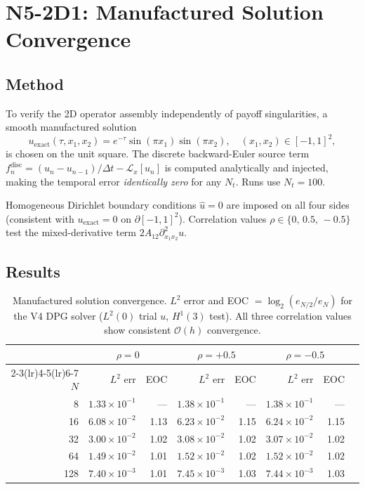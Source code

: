 \documentclass[11pt,a4paper]{article}
\begin{document}
\section{N5-2D1: Manufactured Solution Convergence}
\label{sec:mfg}

\subsection{Method}

To verify the 2D operator assembly independently of payoff singularities, a
smooth manufactured solution
\begin{equation}
  u_{\mathrm{exact}}(\tau,x_1,x_2) = e^{-\tau}\sin(\pi x_1)\sin(\pi x_2),
  \quad (x_1,x_2)\in[-1,1]^2,
\end{equation}
is chosen on the unit square.  The discrete backward-Euler source term
$f_n^{\mathrm{disc}} = (u_n - u_{n-1})/\Delta t - \mathcal{L}_x[u_n]$
is computed analytically and injected, making the temporal error
\emph{identically zero} for any $N_t$.  Runs use $N_t=100$.

Homogeneous Dirichlet boundary conditions $\hat{u}=0$ are imposed on all four
sides (consistent with $u_{\mathrm{exact}}=0$ on $\partial[-1,1]^2$).
Correlation values $\rho\in\{0,\,0.5,\,-0.5\}$ test the mixed-derivative
term $2A_{12}\partial^2_{x_1x_2}u$.

\subsection{Results}

\begin{table}[htbp]
\centering
\caption{Manufactured solution convergence.  $L^2$ error and EOC
  $=\log_2(e_{N/2}/e_N)$ for the V4 DPG solver ($L^2(0)$ trial $u$,
  $H^1(3)$ test).  All three correlation values show consistent $\mathcal{O}(h)$
  convergence.}
\label{tab:mfg}
\small
\begin{tabular}{r r r r r r r r}
\toprule
& \multicolumn{2}{c}{$\rho=0$}
& \multicolumn{2}{c}{$\rho=+0.5$}
& \multicolumn{2}{c}{$\rho=-0.5$} \\
\cmidrule(lr){2-3}\cmidrule(lr){4-5}\cmidrule(lr){6-7}
$N$ & $L^2$ err & EOC & $L^2$ err & EOC & $L^2$ err & EOC \\
\midrule
  8 & $1.33\times10^{-1}$ &  --- & $1.38\times10^{-1}$ &  --- & $1.38\times10^{-1}$ &  --- \\
 16 & $6.08\times10^{-2}$ & 1.13 & $6.23\times10^{-2}$ & 1.15 & $6.24\times10^{-2}$ & 1.15 \\
 32 & $3.00\times10^{-2}$ & 1.02 & $3.08\times10^{-2}$ & 1.02 & $3.07\times10^{-2}$ & 1.02 \\
 64 & $1.49\times10^{-2}$ & 1.01 & $1.52\times10^{-2}$ & 1.02 & $1.52\times10^{-2}$ & 1.02 \\
128 & $7.40\times10^{-3}$ & 1.01 & $7.45\times10^{-3}$ & 1.03 & $7.44\times10^{-3}$ & 1.03 \\
\bottomrule
\end{tabular}
\end{table}
\end{document}
